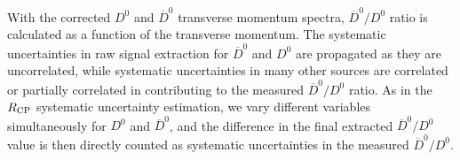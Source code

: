 \documentclass[%
 reprint,	
 amsmath,amssymb,
 aps,
 prc,
]{revtex4-1}
\begin{document}
With the corrected $D^0$ and $\overline{D}^{0}$ transverse momentum spectra, $\overline{D}^{0}/D^0$ ratio is calculated as a function of the transverse momentum. The systematic uncertainties in raw signal extraction for $\overline{D}^{0}$ and $D^0$ are propagated as they are uncorrelated, while systematic uncertainties in many other sources are correlated or partially correlated in contributing to the measured $\overline{D}^{0}/D^0$ ratio. As in the $R_{\rm CP}$ systematic uncertainty estimation, we vary different variables simultaneously for $D^0$ and $\overline{D}^{0}$, and the difference in the final extracted $\overline{D}^{0}/D^0$ value is then directly counted as systematic uncertainties in the measured $\overline{D}^{0}/D^0$.

\begin{table}
\label{table:syserror}
\end{table}
\end{document}
